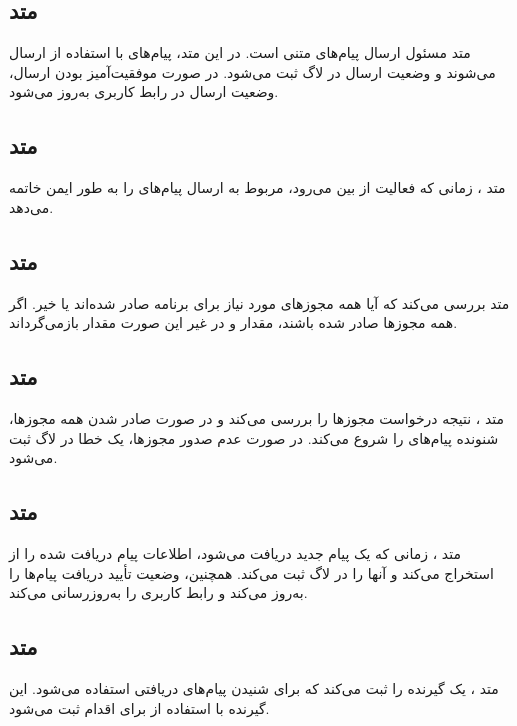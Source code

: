 \documentclass{report}
\begin{document}
\subsection{متد
	}
متد
  مسئول ارسال پیام‌های متنی است. در این متد، پیام‌های
   با استفاده از
    ارسال می‌شوند و وضعیت ارسال در لاگ ثبت می‌شود. در صورت موفقیت‌آمیز بودن ارسال، وضعیت ارسال در رابط کاربری به‌روز می‌شود.

\subsection{متد
	}
متد
، زمانی که فعالیت از بین می‌رود،
 مربوط به ارسال پیام‌های
   را به طور ایمن خاتمه می‌دهد.
   
\subsection{متد
	}

متد 
 بررسی می‌کند که آیا همه مجوزهای مورد نیاز برای برنامه صادر شده‌اند یا خیر. اگر همه مجوزها صادر شده باشند، مقدار 
  و در غیر این صورت مقدار 
   بازمی‌گرداند.


\subsection{متد
}
متد
، نتیجه درخواست مجوزها را بررسی می‌کند و در صورت صادر شدن همه مجوزها، شنونده پیام‌های
 را شروع می‌کند. در صورت عدم صدور مجوزها، یک خطا در لاگ ثبت می‌شود.

\subsection{متد
}
متد 
، زمانی که یک پیام جدید دریافت می‌شود، اطلاعات پیام دریافت شده را از 
 استخراج می‌کند و آنها را در لاگ ثبت می‌کند. همچنین، وضعیت تأیید دریافت پیام‌ها را به‌روز می‌کند و رابط کاربری را به‌روزرسانی می‌کند.

\subsection{متد
}
متد
، یک گیرنده
 را ثبت می‌کند که برای شنیدن پیام‌های دریافتی
   استفاده می‌شود. این گیرنده با استفاده از 
   برای اقدام
     ثبت می‌شود.
\end{document}
